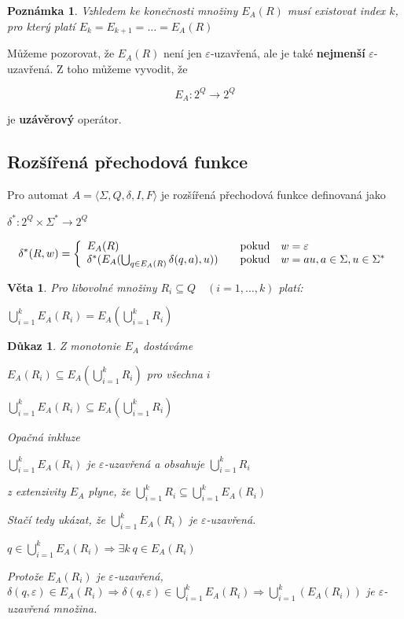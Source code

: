\documentclass[10pt, a4paper, titlepage]{article}
\theoremstyle{note}
\newtheorem{dukaz}{Důkaz}
\newtheorem{veta}{Věta}
\newtheorem{poznamka}{Poznámka}
\begin{document}
\begin{poznamka}
Vzhledem ke konečnosti množiny $E_A(R)$ musí existovat index $k$, pro který platí $E_k = E_{k+1} = \ldots = E_A(R)$
\end{poznamka}

Můžeme pozorovat, že $E_A(R)$ není jen $\varepsilon$-uzavřená, ale je také \textbf{nejmenší} $\varepsilon$-uzavřená. Z toho můžeme vyvodit, že 

$$E_A:2^Q \rightarrow 2^Q$$

je \textbf{uzávěrový} operátor.

\subsection{Rozšířená přechodová funkce}

Pro automat $A = \langle \Sigma,Q,\delta,I,F \rangle$ je rozšířená přechodová funkce definovaná jako

$\delta^*:2^Q \times \Sigma^* \rightarrow 2^Q$

$$
\delta^*(R,w)=\left\{
\begin{array}{l@{\quad\mbox{}\quad}l}
E_A(R) & \text{pokud}\quad w=\varepsilon\\
\delta^*(E_A(\bigcup_{q \in E_A(R)}\delta(q,a),u))& \text{pokud}\quad w=au,a\in\Sigma,u\in\Sigma^*\\
\end{array}
\right.
$$

\begin{veta}
Pro libovolné množiny $R_i \subseteq Q \quad (i=1,\ldots,k)$ platí:

$\bigcup_{i=1}^k E_A(R_i)=E_A(\bigcup_{i=1}^kR_i)$
\end{veta}

\begin{dukaz}
Z monotonie $E_A$ dostáváme

\quad$E_A(R_i) \subseteq E_A(\bigcup_{i=1}^k R_i)$ pro všechna $i$

\quad$\bigcup_{i=1}^kE_A(R_i) \subseteq E_A(\bigcup_{i=1}^k R_i)$

Opačná inkluze

\quad$\bigcup_{i=1}^kE_A(R_i)$ je $\varepsilon$-uzavřená a obsahuje $\bigcup_{i=1}^k R_i$

z extenzivity $E_A$ plyne, že $\bigcup_{i=1}^k R_i \subseteq \bigcup_{i=1}^k E_A(R_i)$

Stačí tedy ukázat, že $\bigcup_{i=1}^k E_A(R_i)$ je $\varepsilon$-uzavřená.

\quad$q \in \bigcup_{i=1}^k E_A(R_i) \Rightarrow \exists k \ q \in E_A(R_i)$

Protože $E_A(R_i)$ je $\varepsilon$-uzavřená, $\delta(q,\varepsilon) \in E_A(R_i) \Rightarrow \delta(q,\varepsilon) \in \bigcup_{i=1}^k E_A(R_i) \Rightarrow \bigcup_{i=1}^k(E_A(R_i))$ je $\varepsilon$-uzavřená množina.
\end{dukaz}
\end{document}
